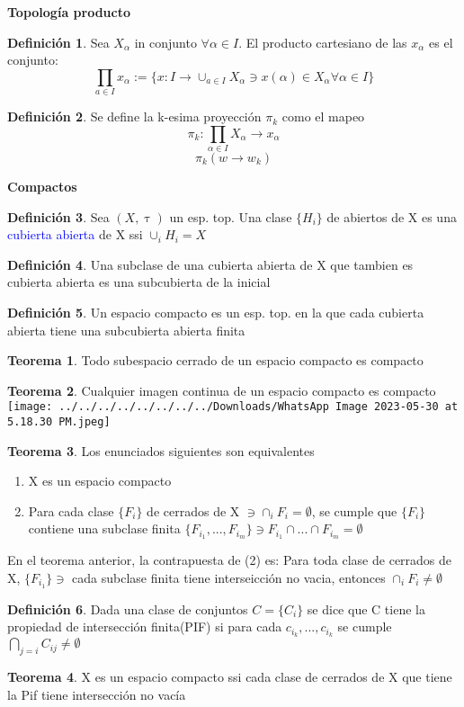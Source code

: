 \documentclass{article}
\theoremstyle{definition}
\newtheorem{definition}{Definición}[section]
\newtheorem{theorem}{Teorema}[section]
\begin{document}
\begin{LARGE}
	\textbf{Topología producto}
\end{LARGE}
\begin{definition}
	Sea $X_{\alpha}$ in conjunto $\forall \alpha \in I$. El producto cartesiano de las $x_{\alpha}$ es el conjunto:
	\[\prod_{a\in I} x_{\alpha}:=\{x:I\to\cup_{a\in I}X_{\alpha}\ni x(\alpha) \in X_{\alpha}\forall \alpha \in I\}\]
\end{definition}
\begin{definition}
	Se define la k-esima proyección $\pi_k$ como el mapeo
	\[\pi_k: \prod_{\alpha \in I}X_{\alpha}\to x_{\alpha}\]
	\[\pi_k(w\to w_k)\]
\end{definition}
\begin{LARGE}
	\textbf{Compactos}
\end{LARGE}
\begin{definition}
	Sea $(X,\uptau)$ un esp. top. Una clase $\{H_i\}$ de abiertos de X es una \textcolor{blue}{cubierta abierta } de X ssi $\cup_iH_i=X$
\end{definition}
\begin{definition}
	Una subclase de una cubierta abierta de X que tambien es cubierta abierta es una subcubierta de la inicial
\end{definition}
\begin{definition}
	Un espacio compacto es un esp. top. en la que cada cubierta abierta tiene una subcubierta abierta finita
\end{definition}
\begin{theorem}
	Todo subespacio cerrado de un espacio compacto es compacto
\end{theorem}
\begin{theorem}
	Cualquier imagen continua de un espacio compacto es compacto\\
	\texttt{[image: ../../../../../../../../Downloads/WhatsApp Image 2023-05-30 at 5.18.30 PM.jpeg]} 
\end{theorem}
\begin{theorem}
	Los enunciados siguientes son equivalentes
	\begin{enumerate}
	\item X es un espacio compacto
	\item Para cada clase $\{F_i\}$ de cerrados de X $\ni\cap_iF_i=\emptyset$, se cumple que $\{F_i\}$ contiene una subclase finita $\{F_{i_1},...,F_{i_m}\}\ni F_{i_1}\cap ...\cap F_{i_m}=\emptyset$
\end{enumerate}
En el teorema anterior, la contrapuesta de (2) es: Para toda clase de cerrados de X, $\{F_{i_1}\}\ni$ cada subclase finita tiene interseicción no vacia, entonces $\cap_iF_i\neq\emptyset$ 
\end{theorem}
\begin{definition}
	Dada una clase de conjuntos $C=\{C_i\}$ se dice que C tiene la propiedad de intersección finita(PIF) si para cada $c_{i_k},...,c_{i_k}$ se cumple $\bigcap\limits_{j=i} C_{ij}\neq \emptyset$
\end{definition}
\begin{theorem}
	X es un espacio compacto ssi cada clase de cerrados de X que tiene la Pif tiene intersección no vacía
\end{theorem}
\end{document}
